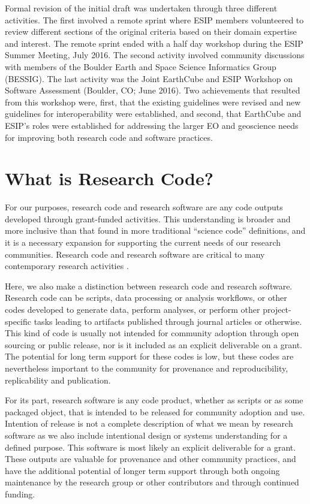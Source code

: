 \documentclass{article}
\begin{document}
Formal revision of the initial draft was undertaken through three different activities. The first involved a remote sprint where ESIP members volunteered to review different sections of the original criteria based on their domain expertise and interest. The remote sprint ended with a half day workshop during the ESIP Summer Meeting, July 2016. The second activity involved community discussions with members of the Boulder Earth and Space Science Informatics Group (BESSIG). The last activity was the Joint EarthCube and ESIP Workshop on Software Assessment (Boulder, CO; June 2016). Two achievements that resulted from this workshop were, first, that the existing guidelines were revised and new guidelines for interoperability were established, and second, that EarthCube and ESIP's roles were established for addressing the larger EO and geoscience needs for improving both research code and software practices.

\section{What is Research Code?}
For our purposes, research code and research software are any code outputs developed through grant-funded activities. This understanding is broader and more inclusive than that found in more traditional “science code” definitions, and it is a necessary expansion for supporting the current needs of our research communities. Research code and research software are critical to many contemporary research activities \autocite{hettrick_research_2016}. 
 
Here, we also make a distinction between research code and research software. Research code can be scripts, data processing or analysis workflows, or other codes developed to generate data, perform analyses, or perform other project-specific tasks leading to artifacts published through journal articles or otherwise. This kind of code is usually not intended for community adoption through open sourcing or public release, nor is it included as an explicit deliverable on a grant. The potential for long term support for these codes is low, but these codes are nevertheless important to the community for provenance and reproducibility, replicability and publication.
 
For its part, research software is any code product, whether as scripts or as some packaged object, that is intended to be released for community adoption and use. Intention of release is not a complete description of what we mean by research software as we also include intentional design or systems understanding for a defined purpose. This software is most likely an explicit deliverable for a grant. These outputs are valuable for provenance and other community practices, and have the additional potential of longer term support through both ongoing maintenance by the research group or other contributors and through continued funding. 
 
\end{document}
